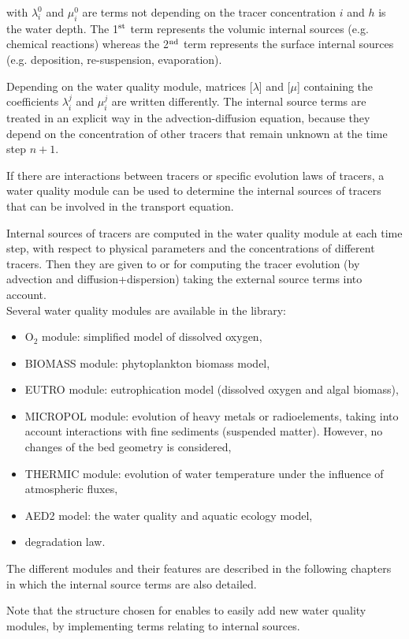with $\lambda_i^0$ and $\mu_i^0$ are terms not depending on the tracer concentration $i$
and $h$ is the water depth.
The 1$^{\rm{st}}$ term represents the volumic internal sources
(e.g. chemical reactions) whereas the 2$^{\rm{nd}}$ term represents the surface internal sources
(e.g. deposition, re-suspension, evaporation).

Depending on the water quality module, matrices [$\lambda$] and [$\mu$]
containing the coefficients $\lambda_i^j$ and $\mu_i^j$ are written differently.
The internal source terms are treated
in an explicit way in the advection-diffusion equation,
because they depend on the concentration of other tracers that remain
unknown at the time step $n+1$.

If there are interactions between tracers or specific evolution laws of tracers,
a water quality module can be used to determine the internal sources of tracers
that can be involved in the transport equation.

Internal sources of tracers are computed in the water quality module \waqtel
at each time step, with respect to physical parameters and
the concentrations of different tracers.
Then they are given to  or  for computing
the tracer evolution (by advection and diffusion+dispersion) taking the
external source terms into account.\\

Several water quality modules are available in the \waqtel library:
\begin{itemize}
  \item O$_2$ module: simplified model of dissolved oxygen,
  \item BIOMASS module: phytoplankton biomass model,
  \item EUTRO module: eutrophication model (dissolved oxygen and algal biomass),
  \item MICROPOL module: evolution of heavy metals or radioelements,
    taking into account interactions with fine sediments (suspended matter).
    However, no changes of the bed geometry is considered,
  \item THERMIC module: evolution of water temperature under the influence
    of atmospheric fluxes,
  \item AED2 model: the water quality and aquatic ecology model,
  \item degradation law.
\end{itemize}

The different modules and their features are described in the following chapters
in which the internal source terms are also detailed.

Note that the structure chosen for \waqtel enables to easily add new
water quality modules, by implementing terms relating to internal sources.
